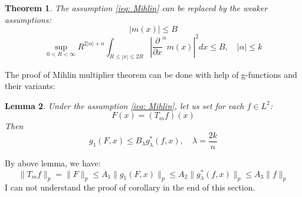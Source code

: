 \documentclass{report}
\theoremstyle{definition}
\theoremstyle{definition}
\theoremstyle{plain}
\newtheorem{theorem}{Theorem}
\newtheorem{lemma}[theorem]{Lemma}
\numberwithin{theorem}{section}
\numberwithin{remark}{section}
\numberwithin{equation}{section}
\newcommand{\norm}[1]{\lVert#1\rVert}
\newcommand{\abs}[1]{\left\lvert#1\right\rvert}
\begin{document}
\begin{theorem}
    The assumption \eqref{ieq: Mihlin} can be replaced by the weaker assumptions:
    \begin{equation*}
        \abs{m(x)}\leq B
    \end{equation*}
    \begin{equation*}
        \sup_{0<R<\infty}R^{2\abs{\alpha}+n}\int_{R\leq\abs{x}\leq 2R}{\abs{\frac{\partial}{\partial x}^\alpha m(x)}^2 dx}\leq B,\quad \abs{\alpha}\leq k
    \end{equation*}
\end{theorem}
The proof of Mihlin multiplier theorem can be done with help of g-functions and their variants:
\begin{lemma}
    Under the assumption \eqref{ieq: Mihlin}, let us set for each $f\in L^2$:
    \begin{equation*}
        F(x)=(T_mf)(x)
    \end{equation*}
    Then
    \begin{equation*}
        g_1(F,x)\leq B_\lambda g_\lambda^*(f,x),\quad \lambda=\frac{2k}{n}
    \end{equation*}
\end{lemma}
By above lemma, we have:
\begin{equation*}
    \norm{T_mf}_p=\norm{F}_p\leq A_1\norm{g_1(F,x)}_p\leq A_2\norm{g_\lambda^*(f,x)}_p\leq A_3\norm{f}_p
\end{equation*}
{\color{blue}I can not understand the proof of corollary in the end of this section.}\par
\end{document}

